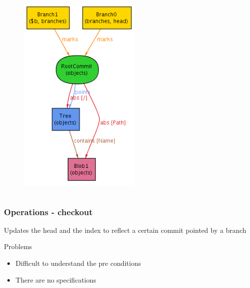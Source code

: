 \documentclass{beamer}
\begin{document}
\begin{frame}[fragile]
\begin{columns}[c]
\begin{figure}
         \includegraphics[width=0.90\textwidth]{images/branch2.png}
      \end{figure}
   \end{columns}
\end{frame}

\begin{frame}[fragile]
   \frametitle{Operations - checkout}
      Updates the head and the index to reflect a certain commit pointed by a
      branch
   \begin{block}{Problems}
      \begin{itemize}
         \item Difficult to understand the pre conditions
         \item There are no specifications
     \end{itemize}
   \end{block}
\end{frame}
\end{document}
